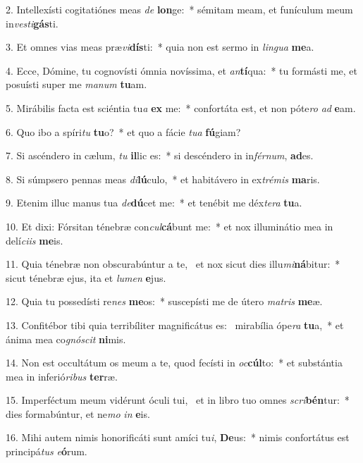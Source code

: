 2. Intellexísti cogitatiónes meas \textit{de} \textbf{lon}ge:~*  sémitam meam, et funículum meum in\textit{ves}\textit{ti}\textbf{gás}ti.\

3. Et omnes vias meas præ\textit{vi}\textbf{dís}ti:~*  quia non est sermo in \textit{lin}\textit{gua} \textbf{me}a.\

4. Ecce, Dómine, tu cognovísti ómnia novíssima, et \textit{an}\textbf{tí}qua:~*  tu formásti me, et posuísti super me \textit{ma}\textit{num} \textbf{tu}am.\

5. Mirábilis facta est sciéntia tu\textit{a} \textbf{ex} me:~*  confortáta est, et non póte\textit{ro} \textit{ad} \textbf{e}am.\

6. Quo ibo a spíri\textit{tu} \textbf{tu}o?~*  et quo a fácie \textit{tu}\textit{a} \textbf{fú}giam?\

7. Si ascéndero in cælum, \textit{tu} \textbf{il}lic es:~*  si descéndero in in\textit{fér}\textit{num}, \textbf{ad}es.\

8. Si súmpsero pennas meas \textit{di}\textbf{lú}culo,~*  et habitávero in ex\textit{tré}\textit{mis} \textbf{ma}ris.\

9. Etenim illuc manus tua \textit{de}\textbf{dú}cet me:~*  et tenébit me déx\textit{te}\textit{ra} \textbf{tu}a.\

10. Et dixi: Fórsitan ténebræ con\textit{cul}\textbf{cá}bunt me:~*  et nox illuminátio mea in delí\textit{ci}\textit{is} \textbf{me}is.\

11. Quia ténebræ non obscurabúntur a te, \dag\  et nox sicut dies illu\textit{mi}\textbf{ná}bitur:~*  sicut ténebræ ejus, ita et \textit{lu}\textit{men} \textbf{e}jus.\

12. Quia tu possedísti re\textit{nes} \textbf{me}os:~*  suscepísti me de útero \textit{ma}\textit{tris} \textbf{me}æ.\

13. Confitébor tibi quia terribíliter magnificátus es: \dag\  mirabília ópe\textit{ra} \textbf{tu}a,~*  et ánima mea co\textit{gnó}\textit{scit} \textbf{ni}mis.\

14. Non est occultátum os meum a te, quod fecísti in \textit{oc}\textbf{cúl}to:~*  et substántia mea in inferió\textit{ri}\textit{bus} \textbf{ter}ræ.\

15. Imperféctum meum vidérunt óculi tui, \dag\  et in libro tuo omnes \textit{scri}\textbf{bén}tur:~*  dies formabúntur, et ne\textit{mo} \textit{in} \textbf{e}is.\

16. Mihi autem nimis honorificáti sunt amíci tu\textit{i}, \textbf{De}us:~*  nimis confortátus est principá\textit{tus} \textit{e}\textbf{ó}rum.\

